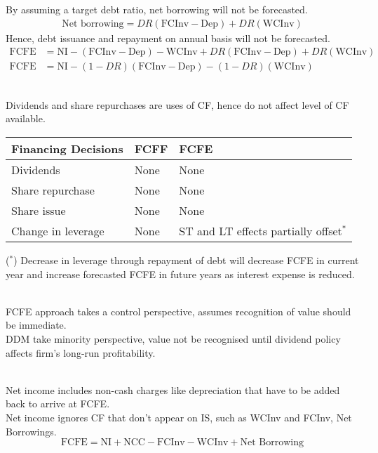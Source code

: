 \begin{method}
\begin{enumerate}[label=\roman*.]
By assuming a target debt ratio, net borrowing will not be forecasted.
\begin{align}
\text{Net borrowing} = DR(\text{FCInv} - \text{Dep}) + DR(\text{WCInv}) \nonumber
\end{align}
Hence, debt issuance and repayment on annual basis will not be forecasted.
\begin{align}
\text{FCFE} &= \text{NI} - (\text{FCInv} - \text{Dep}) - \text{WCInv} + DR(\text{FCInv} - \text{Dep}) + DR(\text{WCInv}) \nonumber \\
\text{FCFE} &= \text{NI} - (1 - DR)(\text{FCInv} - \text{Dep}) - (1-DR)(\text{WCInv}) \nonumber
\end{align}
\end{enumerate}
\end{method}

\begin{remark} \\
Dividends and share repurchases are uses of CF, hence do not affect level of CF available.
\begin{flushleft}
\begin{tabularx}{\textwidth}{p{12em}|X|X}
\hline
\rowcolor{gray!30}
Financing Decisions & FCFF & FCFE \\
\hline
Dividends & None & None \\
Share repurchase & None & None \\
Share issue & None & None \\
Change in leverage & None & ST and LT effects partially offset$^{*}$\\
\hline
\end{tabularx}
($^{*}$) Decrease in leverage through repayment of debt will decrease FCFE in current year and increase forecasted FCFE in future years as interest expense is reduced.
\end{flushleft}
\end{remark}

\begin{remark} \\
FCFE approach takes a control perspective, assumes recognition of value should be immediate.\\
DDM take minority perspective, value not be recognised until dividend policy affects firm's long-run profitability.
\end{remark}

\begin{remark} \\
Net income includes non-cash charges like depreciation that have to be added back to arrive at FCFE.\\
Net income ignores CF that don't appear on IS, such as WCInv and FCInv, Net Borrowings.
\begin{equation}
\text{FCFE} = \text{NI} + \text{NCC} - \text{FCInv} - \text{WCInv} + \text{Net Borrowing} \nonumber
\end{equation}
\end{remark}

